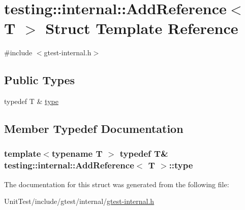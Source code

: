 \hypertarget{structtesting_1_1internal_1_1_add_reference}{\section{testing\+:\+:internal\+:\+:Add\+Reference$<$ T $>$ Struct Template Reference}
\label{structtesting_1_1internal_1_1_add_reference}
}


{\ttfamily \#include $<$gtest-\/internal.\+h$>$}

\subsection*{Public Types}
\begin{DoxyCompactItemize}
\item 
typedef T \& \hyperlink{structtesting_1_1internal_1_1_add_reference_a2df8dd7c4e41f6390e6e66b1a9a67bb4}{type}
\end{DoxyCompactItemize}


\subsection{Member Typedef Documentation}
\hypertarget{structtesting_1_1internal_1_1_add_reference_a2df8dd7c4e41f6390e6e66b1a9a67bb4}{
\subsubsection[{type}]{\setlength{\rightskip}{0pt plus 5cm}template$<$typename T $>$ typedef T\& {\bf testing\+::internal\+::\+Add\+Reference}$<$ T $>$\+::{\bf type}}}\label{structtesting_1_1internal_1_1_add_reference_a2df8dd7c4e41f6390e6e66b1a9a67bb4}


The documentation for this struct was generated from the following file\+:\begin{DoxyCompactItemize}
\item 
Unit\+Test/include/gtest/internal/\hyperlink{gtest-internal_8h}{gtest-\/internal.\+h}\end{DoxyCompactItemize}
